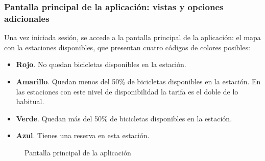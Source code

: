\FloatBarrier
\subsubsection{Pantalla principal de la aplicación: vistas y opciones adicionales}

Una vez iniciada sesión, se accede a la pantalla principal de la aplicación: el mapa con la estaciones disponibles, que presentan cuatro códigos de colores posibles:

\begin{itemize}
	\item \textbf{\color{red} Rojo}. No quedan bicicletas disponibles en la estación.
	\item \textbf{\color{yellow} Amarillo}. Quedan menos del 50\% de bicicletas disponibles en la estación. En las estaciones con este nivel de disponibilidad la tarifa es el doble de lo habitual.
	\item \textbf{\color{green} Verde}. Quedan más del 50\% de bicicletas disponibles en la estación.
	\item \textbf{\color{blue} Azul}. Tienes una reserva en esta estación.
\end{itemize}

\begin{figure} [!htb]
	\centering
	\caption{Pantalla principal de la aplicación}
	\label{fig:pantallaPrincipal}
\end{figure}

